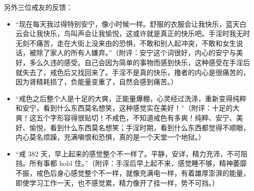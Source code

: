 \begin{case}
    另外三位戒友的反馈：\begin{itemize}
        \item “现在每天我过得特别安宁，像小时候一样。舒服的衣服会让我快乐，蓝天白云会让我快乐，鸟叫声会让我愉悦，这或许就是真正的快乐吧。手淫时我无时无刻不痛苦，走在大街上没来由的恐惧，不敢和别人起冲突，不敢和女生说话，被除了家人的所有人嫌弃。”（附评：安宁这个词很好，内心的安宁与美好，多么久违的感受。自己会因为简单的事物而感到快乐，这种感受在手淫后就失去了，戒色后又找回来了。手淫不是真的快乐，撸者的内心是很痛苦的，因为肾精耗损了，负能量变重了，自然会感到痛苦。）
        \item “戒色之后整个人是十足的大爽，正能量爆棚，心灵经过洗涤，重新变得纯粹和安宁，看到什么东西莫名想笑，这种感觉实在美好！”（附评：十足的大爽！这五个字形容得很贴切！不戒色，不知道戒色有多爽！纯粹、安宁、美好、愉悦，看到什么东西莫名想笑；手淫时期，看到什么东西都觉得不顺眼，内心莫名烦躁，充满嗔恨和恐惧，真的是一个天堂一个地狱。）
        \item “戒 382 天，早上起来的感觉整个不一样了。平静，安详，精力充沛，不可阻挡。所有事都 hold 住。”（附评：手淫后早上起不来，感觉睡不够，精神萎靡不振，戒色后身心感觉整个不一样，就像充满电一样，有着雄厚澎湃的能量，即使学习工作一天，也不感觉累，精力像开了挂一样，势不可挡。）
    \end{itemize}
\end{case}

